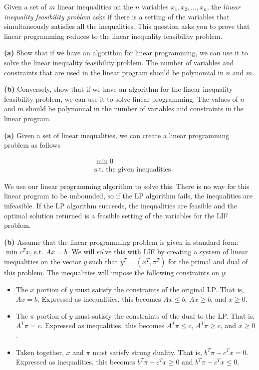 \documentclass[fleqn]{homework}
\begin{document}
  \begin{problem}{6}
    \begin{question}
      Given a set of $m$ linear inequalities on the $n$ variables
      $x_1, x_2, \dots, x_n$, the \textit{linear inequality feasibility problem}
      asks if there is a setting of the variables that simultaneously satisfies
      all the inequalities. This question asks you to prove that linear
      programming reduces to the linear inequality feasibility problem.

      \textbf{(a)} Show that if we have an algorithm for linear programming, we
      can use it to solve the linear inequality feasibility problem. The number
      of variables and constraints that are used in the linear program should be
      polynomial in $n$ and $m$.

      \textbf{(b)} Conversely, show that if we have an algorithm for the linear
      inequality feasibility problem, we can use it to solve linear
      programming. The values of $n$ and $m$ should be polynomial in the number
      of variables and constraints in the linear program.
    \end{question}

    \textbf{(a)} Given a set of linear inequalities, we can create a linear
    programming problem as follows

    \begin{align*}
      &\min 0 \\
      &\text{s.t.  the given inequalities}
    \end{align*}

    We use our linear programming algorithm to solve this.  There is no way for
    this linear program to be unbounded, so if the LP algorithm fails, the
    inequalities are infeasible.  If the LP algorithm succeeds, the inequalities
    are feasible and the optimal solution returned is a feasible setting of the
    variables for the LIF problem.

    \textbf{(b)} Assume that the linear programming problem is given in standard
    form: $\min c^T x$, s.t. $Ax=b$.  We will solve this with LIF by creating a
    system of linear inequalities on the vector $y$ such that $y^T=(x^T,\pi^T)$
    for the primal and dual of this problem.  The inequalities will impose the
    following constraints on $y$:

    \begin{itemize}
    \item The $x$ portion of $y$ must satisfy the constraints of the original
      LP.  That is, $Ax = b$.  Expressed as inequalities, this becomes
      $Ax \le b$, $Ax \ge b$, and $x \ge 0$.
    \item The $\pi$ portion of $y$ must satisfy the constraints of the dual to
      the LP.  That is, $A^T \pi = c$.  Expressed as inequalities, this becomes
      $A^T \pi \le c$, $A^T \pi \ge c$, and $x \ge 0$.
    \item Taken together, $x$ and $\pi$ must satisfy strong duality.  That is,
      $b^T \pi - c^T x = 0$.  Expressed as inequalities, this becomes
      $b^T \pi - c^T x \ge 0$ and $b^T \pi - c^T x \le 0$.
    \end{itemize}


\end{problem}
\end{document}
